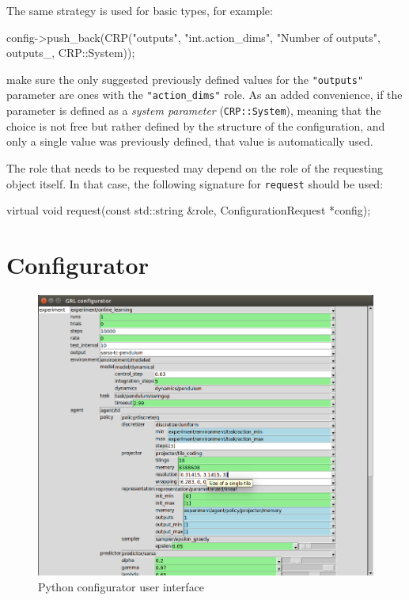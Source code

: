 \documentclass{article}
\newcommand{\txt}[1]{\texttt{#1}}
\newenvironment{code}{\alltt}{\endalltt}
\begin{document}
The same strategy is used for basic types, for example:

\begin{code}
config->push_back(CRP("outputs", "int.action_dims",
                      "Number of outputs", outputs_, CRP::System));
\end{code}

make sure the only suggested previously defined values for the
\txt{"outputs"} parameter are ones with the \txt{"action\_dims"} role. As an added
convenience, if the parameter is defined as a \emph{system parameter}
(\txt{CRP::System}), meaning that the choice is not free but rather defined
by the structure of the configuration, and only a single value was
previously defined, that value is automatically used.

The role that needs to be requested may depend on the role of the requesting
object itself. In that case, the following signature for \txt{request}
should be used:

\begin{code}
virtual void request(const std::string \&role, ConfigurationRequest *config);
\end{code}

\section{Configurator}
\label{sec:grlc}

\begin{figure}[H]
\includegraphics[width=\linewidth]{grl.png}
\caption{Python configurator user interface}
\label{fig:conf}
\end{figure}
\end{document}
